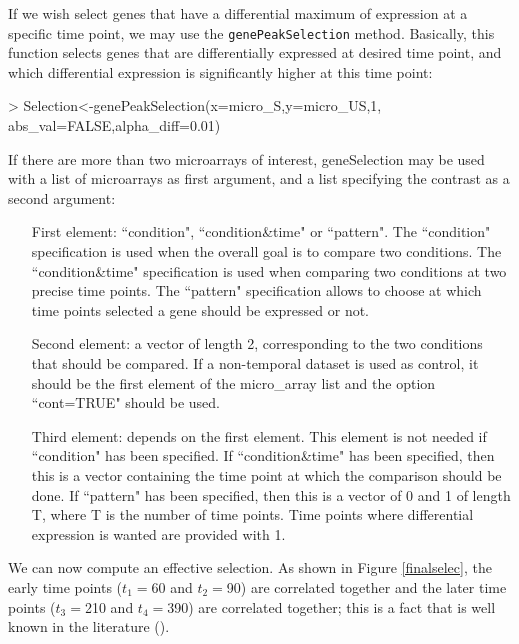 \documentclass[a4paper]{article}
\begin{document}
If we wish select genes that have a differential maximum of expression at a specific time point, we may use the \texttt{genePeakSelection} method. Basically, this function selects genes that are differentially expressed at desired time point, and which differential expression is significantly higher at this time point:

\begin{Schunk}
\begin{Sinput}
> Selection<-genePeakSelection(x=micro_S,y=micro_US,1,
   abs_val=FALSE,alpha_diff=0.01)
\end{Sinput}
\end{Schunk}


If there are more than two microarrays of interest, geneSelection may be used with a list of  microarrays as first argument, and a list specifying the contrast as a second argument:


\begin{itemize}
\item[First element:] ``condition", ``condition\&time" or ``pattern". The ``condition" specification is used when the overall goal is to compare two conditions. 
The ``condition\&time" specification is used when comparing two conditions at two precise time points.
The ``pattern" specification allows to choose at which time points selected a gene should be expressed or not. 
\item[Second element:] a vector of length 2, corresponding to the two conditions that should be compared. If a non-temporal dataset is used as control, it should be the first element of the micro\_array list and the option ``cont=TRUE" should be used. 
\item[Third element:] depends on the first element. 
This element is not needed if ``condition" has been specified. 
If ``condition\&time" has been specified, then this is a vector containing the time point at which the comparison should be done.
If ``pattern" has been specified, then this is a vector of 0 and 1 of length T, where T is the number of time points. 
Time points where differential expression is wanted are provided with 1. 
\end{itemize}


We can now compute an effective selection. As shown in Figure \ref{finalselec}, the early time points ($t_1=$60 and $t_2=$90) are correlated together and the later time points  ($t_3=$210 and $t_4=$390) are correlated together; this is a fact that is well known in the literature (\cite{yosef2011impulse}). \\
\end{document}
